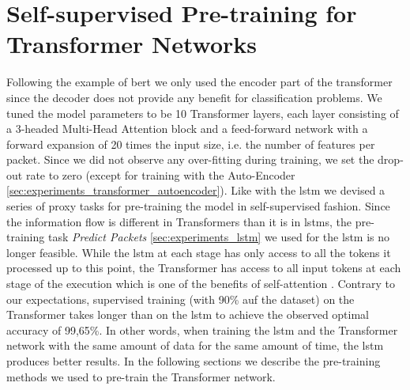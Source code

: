 \section{Self-supervised Pre-training for Transformer Networks} \label{sec:experiments_transformer}

Following the example of \gls{bert} we only used the encoder part of the transformer since the decoder does not provide any benefit for classification problems. We tuned the model parameters to be 10 Transformer layers, each layer consisting of a 3-headed Multi-Head Attention block and a feed-forward network with a forward expansion of 20 times the input size, i.e. the number of features per packet. Since we did not observe any over-fitting during training, we set the drop-out rate to zero (except for training with the Auto-Encoder \ref{sec:experiments_transformer_autoencoder}). 
Like with the \gls{lstm} we devised a series of proxy tasks for pre-training the model in self-supervised fashion. Since the information flow is different in Transformers than it is in \glspl{lstm}, the pre-training task \textit{Predict Packets} \ref{sec:experiments_lstm} we used for the \gls{lstm} is no longer feasible. While the \gls{lstm} at each stage has only access to all the tokens it processed up to this point, the Transformer has access to all input tokens at each stage of the execution which is one of the benefits of self-attention \cite{attention}. Contrary to our expectations, supervised training (with 90\% auf the dataset) on the Transformer takes longer than on the \gls{lstm} to achieve the observed optimal accuracy of 99,65\%. In other words, when training the \gls{lstm} and the Transformer network with the same amount of data for the same amount of time, the \gls{lstm} produces better results. In the following sections we describe the pre-training methods we used to pre-train the Transformer network.


